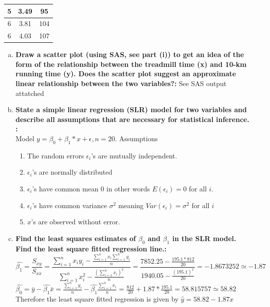 \documentclass{article}
\begin{document}
\begin{enumerate}[1.]
{\begin{center}
\begin{tabular}{||c c c||}
\hline
5 & 3.49 & 95\\
\hline
6 & 3.81 & 104\\
\hline
6 & 4.03 & 107  \\ [1ex]
 \hline
\end{tabular}
\end{center}
}
\begin{enumerate}[(a)]
  \item \textbf{Draw a scatter plot (using SAS, see part (i)) to get an idea of the form of the relationship
between the treadmill time (x) and 10-km running time (y). Does the scatter plot suggest
an approximate linear relationship between the two variables?: }
See SAS output attatched \\
  \item \textbf{State a simple linear regression (SLR) model for two variables and describe all assumptions that are necessary for statistical inference.
: } \\
Model $y = \beta_0 + \beta_1 * x+ \epsilon, n = 20$.
Assumptions
  \begin{enumerate}[(1)]
   \item The random errors $\epsilon_i$'s are mutually independent.
   \item $\epsilon_i$'s are normally distributed
   \item $\epsilon_i$'s have common mean 0 in other words $E(\epsilon_i) = 0$ for all $i$.
   \item $\epsilon_i$'s have common variance $\sigma^2$ meaning $Var(\epsilon_i) = \sigma^2$ for all $i$
  \item $x$'s are observed without error.
\end{enumerate}
  \item \textbf{Find the least squares estimates of $\beta_0$ and $\beta_1$ in the SLR model. Find the least square
fitted regression line.: } \\
\begingroup
\Large
\begin{equation}
\hat{\beta_1} = \frac{S_{xy}}{S_{xx}} = \frac{  \sum_{i=1}^{n}{x_iy_i }  - \frac{  \sum_{i=1}^{n}{x_i}  \sum_{i=1}^{n}{y_i}  }{n} }
{  \sum_{i=1}^{n}{x_{i}^2} - \frac{    (\sum_{i=1}^{n}{x_i})^2    }{ n }}   = \frac{ 7852.25 - \frac{195.1 * 812}{20}  }{ 1940.05 - \frac{(195.1)^2 }{20} }  = -1.8673252 \simeq -1.87  \nonumber
\end{equation}
$\hat{\beta_0} = \bar{y} - \hat{\beta_1}\bar{x} = \frac{ \sum_{i=1}^{n}{y_i} }{n} - \hat{\beta_1}\frac{\sum_{i=1}^{n}{x_i} }{n} = \frac{812}{20} + 1.87 * \frac{195.1}{20} = 58.815757 \simeq 58.82 $
\endgroup
Therefore the least square fitted regression is given by $\hat{y} = 58.82 - 1.87x$ 


\end{enumerate}
\end{enumerate}
\end{document}
